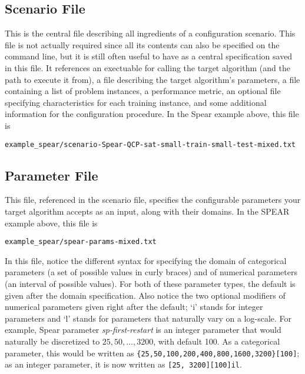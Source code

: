 \documentclass[11pt,letterpaper,twoside]{article}
\begin{document}
\subsection{Scenario File}
This is the central file describing all ingredients of a configuration scenario.
This file is not actually required since all its contents can also be specified on the command line, but it is still often useful to have as a central specification saved in this file. It references an exectuable for calling the target algorithm (and the path to execute it from), a file describing the target algorithm's parameters, a file containing a list of problem instances, a performance metric, an optional file specifying characteristics for each training instance, and some additional information for the configuration procedure. In the Spear example above, this file is

{\footnotesize
\begin{alltt}
example_spear/scenario-Spear-QCP-sat-small-train-small-test-mixed.txt
\end{alltt}}

\subsection{Parameter File}
This file, referenced in the scenario file, specifies the configurable parameters your target algorithm accepts as an input, along with their domains. In the SPEAR example above, this file is 

{\footnotesize
\begin{alltt}
example_spear/spear-params-mixed.txt
\end{alltt}
}

In this file, notice the different syntax for specifying the domain of categorical parameters (a set of possible values in curly braces) and of numerical parameters (an interval of possible values). For both of these parameter types, the default is given after the domain specification. Also notice the two optional modifiers of numerical parameters given right after the default; `i' stands for integer parameters and `l' stands for parameters that naturally vary on a log-scale. For example, Spear parameter \emph{sp-first-restart} is an integer parameter that would naturally be discretized to $25, 50, \dots, 3200$, with default 100. As a categorical parameter, this would be written as {\footnotesize\texttt{\{25,50,100,200,400,800,1600,3200\}[100]}}; as an integer parameter, it is now written as {\footnotesize\texttt{[25, 3200][100]il}}.
\end{document}

